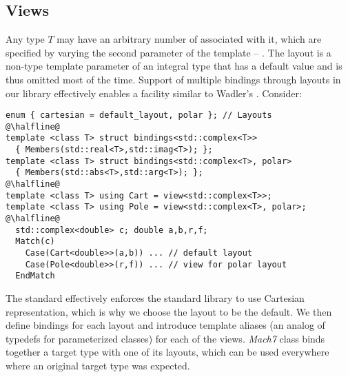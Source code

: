 
\subsection{Views}
\label{sec:view}

Any type $T$ may have an arbitrary number of  associated with it, 
which are specified by varying the second parameter of the  
template -- . The layout is a non-type template parameter of an 
integral type that has a default value and is thus omitted most of the time.
Support of multiple bindings through layouts in our library effectively enables 
a facility similar to Wadler's \cite{Wadler87}. Consider:

\begin{lstlisting}
enum { cartesian = default_layout, polar }; // Layouts
@\halfline@
template <class T> struct bindings<std::complex<T>>
  { Members(std::real<T>,std::imag<T>); };
template <class T> struct bindings<std::complex<T>, polar>
  { Members(std::abs<T>,std::arg<T>); };
@\halfline@
template <class T> using Cart = view<std::complex<T>>;
template <class T> using Pole = view<std::complex<T>, polar>;
@\halfline@
  std::complex<double> c; double a,b,r,f;
  Match(c)
    Case(Cart<double>>(a,b)) ... // default layout
    Case(Pole<double>>(r,f)) ... // view for polar layout
  EndMatch
\end{lstlisting}

\noindent
The \Cpp{} standard effectively enforces the standard library to use Cartesian 
representation\cite[-4]{C++11}, which is why we choose the 
 layout to be the default. We then define bindings for each 
layout and introduce template aliases (an analog of typedefs for parameterized 
classes) for each of the views. \emph{Mach7} class  binds together a 
target type with one of its layouts, which can be used everywhere where an 
original target type was expected.

